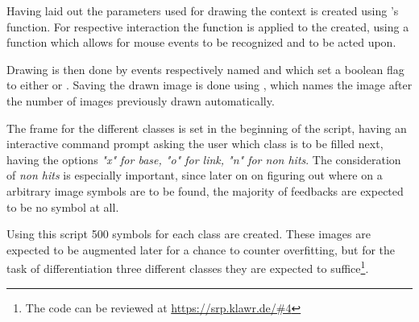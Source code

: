 Having laid out the parameters used for drawing the context is created using 's  function.
For respective interaction the  function is applied to the  created, using a  function which allows for mouse events to be recognized and to be acted upon.

Drawing is then done by events respectively named  and  which set a boolean  flag to either  or .
Saving the drawn image is done using , which names the image after the number of images previously drawn automatically.

The frame for the different classes is set in the beginning of the script, having an interactive command prompt asking the user which class is to be filled next, having the options \textit{"x" for base, "o" for link, "n" for non hits}.
The consideration of \textit{non hits} is especially important, since later on on figuring out where on a arbitrary image symbols are to be found, the majority of feedbacks are expected to be no symbol at all.

Using this script 500 symbols for each class are created.
These images are expected to be augmented later for a chance to counter overfitting, but for the task of differentiation three different classes they are expected to suffice\footnote{The code can be reviewed at \url{https://srp.klawr.de/\#4}}.


